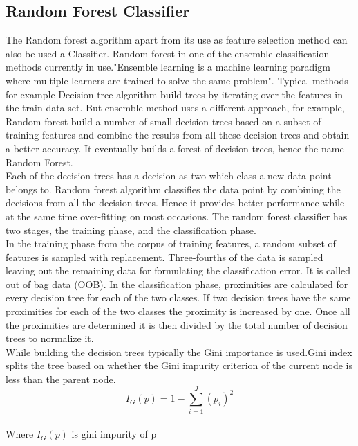 \documentclass[sigconf]{acmart}
\begin{document}
\subsection{Random Forest Classifier}
The Random forest algorithm apart from its use as feature selection method can also be used a Classifier. Random forest in one of the ensemble classification methods currently in use."Ensemble learning is a machine learning paradigm where multiple learners are trained to solve the same problem"\cite{Zhou2016}. Typical methods for example Decision tree algorithm build trees by iterating over the features in the train data set. But ensemble method uses a different approach, for example, Random forest build a number of small decision trees based on a subset of training features and combine the results from all these decision trees and obtain a better accuracy. It eventually builds a forest of decision trees, hence the name Random Forest.\cite{Breiman2010}\\
Each of the decision trees has a decision as two which class a new data point belongs to. Random forest algorithm classifies the data point by combining the decisions from all the decision trees. Hence it provides better performance while at the same time over-fitting on most occasions. The random forest classifier has two stages, the training phase, and the classification phase. \cite{Breiman2010}\\
In the training phase from the corpus of training features, a random subset of features is sampled with replacement. Three-fourths of the data is sampled leaving out the remaining data for formulating the classification error. It is called out of bag data (OOB). In the classification phase, proximities are calculated for every decision tree for each of the two classes. If two decision trees have the same proximities for each of the two classes the proximity is increased by one. Once all the proximities are determined it is then divided by the total number of decision trees to normalize it.\cite{Breiman2010}\\
While building the decision trees typically the Gini importance is used.Gini index splits the tree based on whether the Gini impurity criterion of the current node is less than the parent node.\\
\cite{Breiman2010}
\begin{equation}
    I_G(p) = 1-\sum_{i=1}^{J} (p_i)^2
\end{equation}\\
Where $I_G(p)$ is gini impurity of p\\
\end{document}
